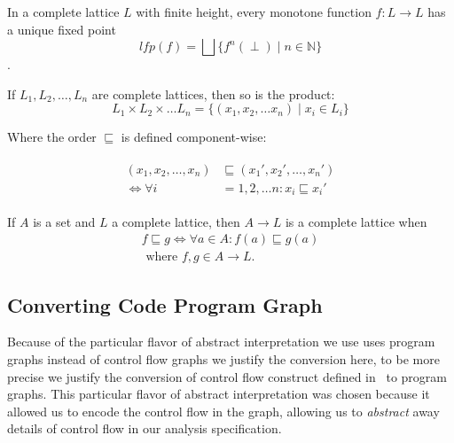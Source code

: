 \begin{theorem}\label{thm:kleene_finite}
In a complete lattice $L$ with finite height, every monotone function $f : L \rightarrow L$ has a unique fixed point
\begin{equation}
    lfp(f) = \bigsqcup\{f^n(\perp) \mid n \in \mathbb{N}\}\label{eq:equation6}
\end{equation}.
\end{theorem}


\begin{theorem}
    If $L_1, L_2, \dots, L_n$ are complete lattices, then so is the product:
    \begin{equation}
        L_1 \times L_2 \times \dots L_n = \{(x_1, x_2, \dots x_n) \mid x_i \in L_i\}\label{eq:equation7}
    \end{equation}

    Where the order $\sqsubseteq$ is defined component-wise:

    \begin{align}
        \begin{split}
        (x_1, x_2, \dots, x_n) &\sqsubseteq (x_1', x_2', \dots, x_n') \\
        \iff
        \forall i &= 1, 2, \dots n : x_i \sqsubseteq x_i'
        \end{split}
    \end{align}
\end{theorem}

\begin{theorem}
    If $A$ is a set and $L$ a complete lattice, then $A \rightarrow L$ is a complete lattice when
    \begin{equation}
        \begin{split}
            f \sqsubseteq g \iff \forall a \in A : f(a) \sqsubseteq g(a) \\ \text{ where } f,g \in A \rightarrow L.\label{eq:equation-complete-lattice-theorem}
        \end{split}
    \end{equation}
\end{theorem}

\subsection{Converting Code Program Graph}\label{subsec:converting-code-program-graph}

Because of the particular flavor of abstract interpretation we use uses program graphs instead of control flow graphs we justify the conversion here, to be more precise we justify the conversion of control flow construct defined in~\cite{halder_abstract_2012} to program graphs.
This particular flavor of abstract interpretation was chosen because it allowed us to encode the control flow in the graph, allowing us to \emph{abstract} away details of control flow in our analysis specification.

